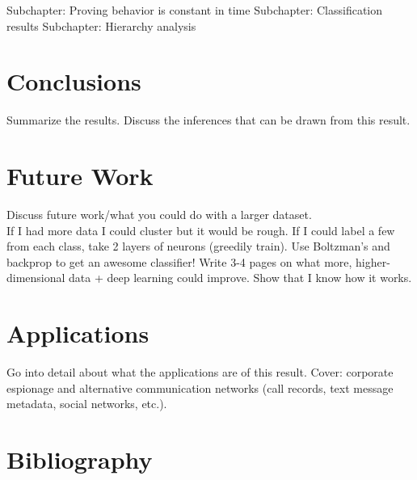 \documentclass[12pt,dvips]{report}
\begin{document}
Subchapter: Proving behavior is constant in time
Subchapter: Classification results
Subchapter: Hierarchy analysis

\chapter{Conclusions}
Summarize the results.  Discuss the inferences that can be drawn from this result. 

\chapter{Future Work}
Discuss future work/what you could do with a larger dataset.
\\If I had more data I could cluster but it would be rough.  If I could label a few from each class, take 2 layers of neurons (greedily train).  Use Boltzman's and backprop to get an awesome classifier!  Write 3-4 pages on what more, higher-dimensional data + deep learning could improve.  Show that I know how it works.

\chapter{Applications}
Go into detail about what the applications are of this result.  Cover: corporate espionage and alternative communication networks (call records, text message metadata, social networks, etc.).


%
%

%



%
\chapter*{Bibliography}


\end{document}
